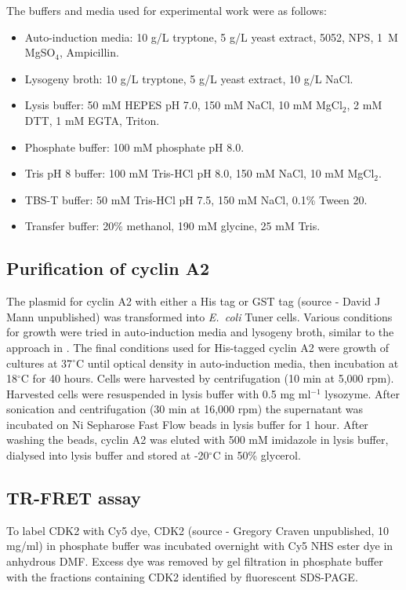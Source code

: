 The buffers and media used for experimental work were as follows:
\begin{itemize}
\item Auto-induction media: 10 g/L tryptone, 5 g/L yeast extract, 5052, NPS, 1~M MgSO$_{4}$, Ampicillin.
\item Lysogeny broth: 10 g/L tryptone, 5 g/L yeast extract, 10 g/L NaCl.
\item Lysis buffer: 50 mM HEPES pH 7.0, 150 mM NaCl, 10 mM MgCl$_{2}$, 2 mM DTT, 1 mM EGTA, Triton.
\item Phosphate buffer: 100 mM phosphate pH 8.0.
\item Tris pH 8 buffer: 100 mM Tris-HCl pH 8.0, 150 mM NaCl, 10 mM MgCl$_{2}$.
\item TBS-T buffer: 50 mM Tris-HCl pH 7.5, 150 mM NaCl, 0.1\% Tween 20.
\item Transfer buffer: 20\% methanol, 190 mM glycine, 25 mM Tris.
\end{itemize}


\subsection{Purification of cyclin A2}

The plasmid for cyclin A2 with either a His tag or GST tag (source - David J Mann unpublished) was transformed into \textit{E.\ coli} Tuner cells.
Various conditions for growth were tried in auto-induction media and lysogeny broth, similar to the approach in \cite{Wang2007}.
The final conditions used for His-tagged cyclin A2 were growth of cultures at 37$^{\circ}$C until optical density in auto-induction media, then incubation at 18$^{\circ}$C for 40 hours.
Cells were harvested by centrifugation (10 min at 5,000 rpm).
Harvested cells were resuspended in lysis buffer with 0.5 mg ml$^{-1}$ lysozyme.
After sonication and centrifugation (30 min at 16,000 rpm) the supernatant was incubated on Ni Sepharose Fast Flow beads in lysis buffer for 1 hour.
After washing the beads, cyclin A2 was eluted with 500 mM imidazole in lysis buffer, dialysed into lysis buffer and stored at -20$^{\circ}$C in 50\% glycerol.


\subsection{TR-FRET assay}

To label CDK2 with Cy5 dye, CDK2 (source - Gregory Craven unpublished, 10 mg/ml) in phosphate buffer was incubated overnight with Cy5 NHS ester dye in anhydrous DMF.
Excess dye was removed by gel filtration in phosphate buffer with the fractions containing CDK2 identified by fluorescent SDS-PAGE.

